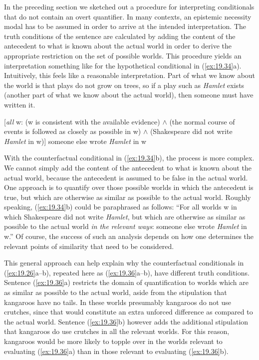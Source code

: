 In the preceding section we sketched out a procedure for interpreting conditionals that do not contain an overt quantifier. In many contexts, an epistemic necessity modal has to be assumed in order to arrive at the intended interpretation. The truth conditions of the sentence are calculated by adding the content of the antecedent to what is known about the actual world in order to derive the appropriate restriction on the set of possible worlds. This procedure yields an interpretation something like  for the hypothetical conditional in (\ref{ex:19.34}a). Intuitively, this feels like a reasonable interpretation. Part of what we know about the world is that plays do not grow on trees, so if a play such as \textit{Hamlet} exists (another part of what we know about the actual world), then someone must have written it.


\ea \label{ex:19.35}
{}[\textit{all} w: (w is consistent with the available evidence) $\wedge$ (the normal course of events is followed as closely as possible in w) $\wedge$ (Shakespeare did not write \textit{Hamlet} in w)] someone else wrote \textit{Hamlet} in w
\z


With the counterfactual conditional in (\ref{ex:19.34}b), the process is more complex. We cannot simply add the content of the antecedent to what is known about the actual world, because the antecedent is assumed to be false in the actual world. One approach is to quantify over those possible worlds in which the antecedent is true, but which are otherwise as similar as possible to the actual world. Roughly speaking, (\ref{ex:19.34}b) could be paraphrased as follows: “For all worlds w in which Shakespeare did not write \textit{Hamlet}, but which are otherwise as similar as possible to the actual world \textit{in the relevant ways}: someone else wrote \textit{Hamlet} in w.” Of course, the success of such an analysis depends on how one determines the relevant points of similarity that need to be considered.



This general approach can help explain why the counterfactual conditionals in (\ref{ex:19.26}a--b), repeated here as (\ref{ex:19.36}a--b), have different truth conditions. Sentence (\ref{ex:19.36}a) restricts the domain of quantification to worlds which are as similar as possible to the actual world, aside from the stipulation that kangaroos have no tails. In these worlds presumably kangaroos do not use crutches, since that would constitute an extra unforced difference as compared to the actual world. Sentence (\ref{ex:19.36}b) however adds the additional stipulation that kangaroos do use crutches in all the relevant worlds. For this reason, kangaroos would be more likely to topple over in the worlds relevant to evaluating (\ref{ex:19.36}a) than in those relevant to evaluating (\ref{ex:19.36}b).


